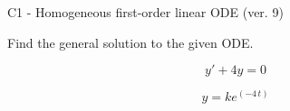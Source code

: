 \begin{exercise}
  \begin{exerciseTitle}C1 - Homogeneous first-order linear ODE (ver. 9)\end{exerciseTitle}
  \begin{exerciseStatement}
    
Find the general solution to the given ODE.

    
\[y'+4y=0\]

  \end{exerciseStatement}
  \begin{exerciseAnswer}
    
\[y= k e^{\left(-4 \, t\right)}\]

  \end{exerciseAnswer}
\end{exercise}